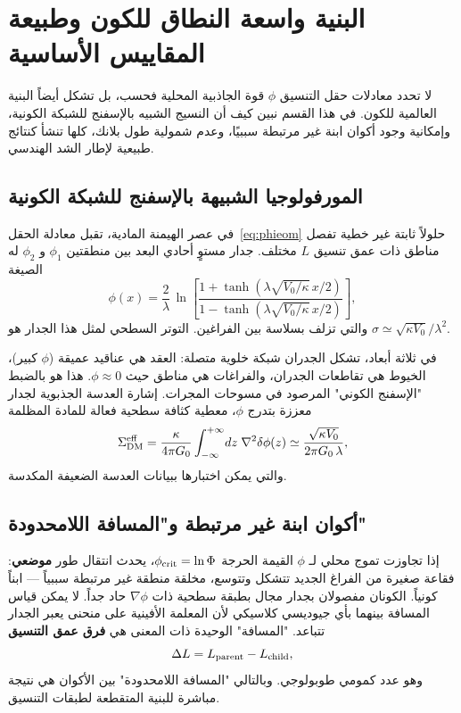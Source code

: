 \documentclass[12pt,a4paper]{article}
\begin{document}
	\section{البنية واسعة النطاق للكون وطبيعة المقاييس الأساسية}
	\label{sec:sponge}
	
	لا تحدد معادلات حقل التنسيق \(\phi\) قوة الجاذبية المحلية فحسب، بل تشكل أيضاً البنية العالمية للكون. في هذا القسم نبين كيف أن النسيج الشبيه بالإسفنج للشبكة الكونية، وإمكانية وجود أكوان ابنة غير مرتبطة سببيًا، وعدم شمولية طول بلانك، كلها تنشأ كنتائج طبيعية لإطار الشد الهندسي.
	
	\subsection{المورفولوجيا الشبيهة بالإسفنج للشبكة الكونية}
	في عصر الهيمنة المادية، تقبل معادلة الحقل~\eqref{eq:phieom} حلولاً ثابتة غير خطية تفصل مناطق ذات عمق تنسيق \(L\) مختلف. جدار مستوٍ أحادي البعد بين منطقتين \(\phi_1\) و \(\phi_2\) له الصيغة
	\begin{equation}
		\phi(x) = \frac{2}{\lambda}\,\ln\!\left[
		\frac{1 + \tanh(\lambda\sqrt{V_0/\kappa}\, x/2)}
		{1 - \tanh(\lambda\sqrt{V_0/\kappa}\, x/2)}
		\right],
		\label{eq:domain-wall}
	\end{equation}
	والتي تزلف بسلاسة بين الفراغين. التوتر السطحي لمثل هذا الجدار هو \(\sigma \simeq \sqrt{\kappa V_0}/\lambda^2\).
	
	في ثلاثة أبعاد، تشكل الجدران شبكة خلوية متصلة: العقد هي عناقيد عميقة (\(\phi\) كبير)، الخيوط هي تقاطعات الجدران، والفراغات هي مناطق حيث \(\phi \approx 0\). هذا هو بالضبط "الإسفنج الكوني" المرصود في مسوحات المجرات. إشارة العدسة الجذبوية لجدار معززة بتدرج \(\phi\)، معطية كثافة سطحية فعالة للمادة المظلمة
	\begin{equation}
		\Sigma_{\rm DM}^{\rm eff} = \frac{\kappa}{4\pi G_0} \int_{-\infty}^{+\infty} \!dz\; \nabla^2\delta\phi(z)
		\simeq \frac{\sqrt{\kappa V_0}}{2\pi G_0\,\lambda},
		\label{eq:wall-lensing}
	\end{equation}
	والتي يمكن اختبارها ببيانات العدسة الضعيفة المكدسة.
	
	\subsection{أكوان ابنة غير مرتبطة و"المسافة اللامحدودة"}
	إذا تجاوزت تموج محلي لـ \(\phi\) القيمة الحرجة \(\phi_{\rm crit}=\ln\Phi\)، يحدث انتقال طور \textbf{موضعي}: فقاعة صغيرة من الفراغ الجديد تتشكل وتتوسع، مخلقة منطقة غير مرتبطة سببياً — ابناً كونياً. الكونان مفصولان بجدار مجال بطبقة سطحية ذات \(\nabla\phi\) حاد جداً. لا يمكن قياس المسافة بينهما بأي جيوديسي كلاسيكي لأن المعلمة الأفينية على منحنى يعبر الجدار تتباعد. "المسافة" الوحيدة ذات المعنى هي \textbf{فرق عمق التنسيق}
	\begin{equation}
		\Delta L = L_{\rm parent} - L_{\rm child},
		\label{eq:deltaL}
	\end{equation}
	وهو عدد كمومي طوبولوجي. وبالتالي "المسافة اللامحدودة" بين الأكوان هي نتيجة مباشرة للبنية المتقطعة لطبقات التنسيق.
	
\end{document}
